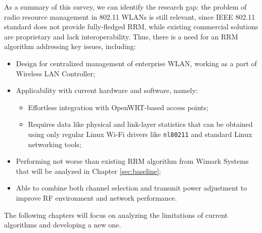 As a summary of this survey, we can identify the research gap: the problem of radio resource management in 802.11 WLANs is still relevant, since IEEE 802.11 standard does not provide fully-fledged RRM, while existing commercial solutions are proprietary and lack interoperability. Thus, there is a need for an RRM algorithm addressing key issues, including:
\begin{itemize}
    \item Design for centralized management of enterprise WLAN, working as a part of Wireless LAN Controller;
    \item Applicability with current hardware and software, namely:
    \begin{itemize}
        \item Effortless integration with OpenWRT-based access points;
        \item Requires data like physical and link-layer statistics that can be obtained using only regular Linux Wi-Fi drivers like \texttt{nl80211} and standard Linux networking tools;
    \end{itemize}
    \item Performing not worse than existing RRM algorithm from Wimark Systems that will be analyzed in Chapter \ref{sec:baseline};
    \item Able to combine both channel selection and transmit power adjustment to improve RF environment and network performance.
\end{itemize}

The following chapters will focus on analyzing the limitations of current algorithms and developing a new one.